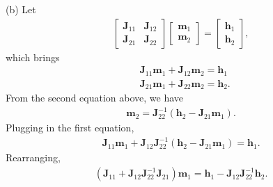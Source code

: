 \documentclass{article}
\newcommand{\bm}{\mathbf}
\begin{document}
\noindent
(b) Let
\begin{align*}
\begin{bmatrix}
    \bm{J}_{11} & \bm{J}_{12} \\
    \bm{J}_{21} & \bm{J}_{22}
\end{bmatrix}
\begin{bmatrix}
    \bm{m}_{1}\\
    \bm{m}_{2}
\end{bmatrix} = 
\begin{bmatrix}
    \bm{h}_{1}\\
    \bm{h}_{2}
\end{bmatrix},
\end{align*}
which brings
\begin{align*}
	&\bm{J}_{11}\bm{m}_1 + \bm{J}_{12}\bm{m}_2 = \bm{h}_1\\
	&\bm{J}_{21}\bm{m}_1 + \bm{J}_{22}\bm{m}_2 = \bm{h}_2.
\end{align*}
%
From the second equation above, we have
\begin{align*}
	\bm{m}_2 = \bm{J}_{22}^{-1}(\bm{h}_2 - \bm{J}_{21}\bm{m}_1).
\end{align*}
%
Plugging in the first equation,
\begin{align*}
	\bm{J}_{11}\bm{m}_1 + \bm{J}_{12}\bm{J}_{22}^{-1}(\bm{h}_2 - \bm{J}_{21}\bm{m}_1) = \bm{h}_1.
\end{align*}
Rearranging,
\begin{align*}
	\left(\bm{J}_{11} + \bm{J}_{12}\bm{J}_{22}^{-1}\bm{J}_{21}\right)\bm{m}_1 = \bm{h}_1 - \bm{J}_{12}\bm{J}_{22}^{-1}\bm{h}_2.
\end{align*}
\\
\end{document}
